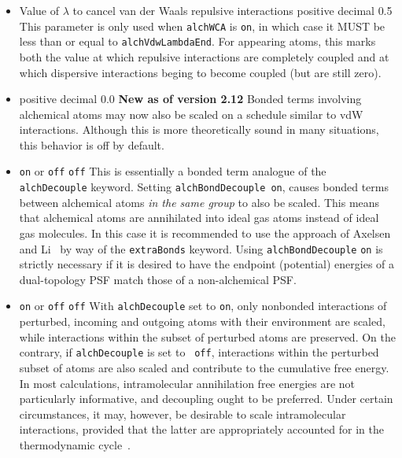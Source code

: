 \begin{itemize}
\item
{}
{Value of $\lambda$ to cancel van der Waals repulsive interactions}
{positive decimal}
{0.5}
{
This parameter is only used when {\tt alchWCA} is {\tt on}, in which case it
  MUST be less than or equal to {\tt alchVdwLambdaEnd}.
For appearing atoms, this marks both the value at which repulsive interactions
  are completely coupled and at which dispersive interactions beging to become
  coupled (but are still zero).
}

\item
{positive decimal}
{0.0}
{{\bf New as of version 2.12} Bonded terms involving alchemical atoms may now
also be scaled on a schedule similar to vdW interactions. Although this is more
theoretically sound in many situations, this behavior is off by default.
}

\item
{{\tt on} or {\tt off}}
{{\tt off}}
{This is essentially a bonded term analogue of the {\tt alchDecouple} keyword.
Setting {\tt alchBondDecouple on}, causes bonded terms between alchemical 
atoms \emph{in the same group} to also be scaled.  This means that alchemical
atoms are annihilated into ideal gas atoms instead of ideal gas molecules.  In 
this case it is recommended to use the approach of Axelsen and 
Li~\cite{Axelsen1998} by way of the {\tt extraBonds} keyword.  Using
{\tt alchBondDecouple} {\tt on} is strictly necessary if it is desired to have
the endpoint (potential) energies of a dual-topology PSF match those of a 
non-alchemical PSF.
}


\item
{{\tt on} or {\tt off}} {{\tt off}} {With {\tt alchDecouple} set to {\tt on},
only nonbonded interactions of perturbed, incoming and outgoing atoms with
their environment are scaled, while interactions within the subset of perturbed
atoms are preserved. On the contrary, if {\tt alchDecouple} is set to {\tt
off}, interactions within the perturbed subset of atoms are also scaled and
contribute to the cumulative free energy. In most calculations, intramolecular
annihilation free energies are not particularly informative, and decoupling
ought to be preferred. Under certain circumstances, it may, however, be
desirable to scale intramolecular interactions, provided that the latter are
appropriately accounted for in the thermodynamic cycle~\cite{Chipot2007}. }


\end{itemize}
